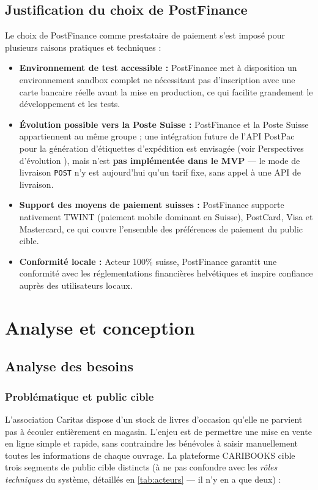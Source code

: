 \documentclass[12pt, a4paper]{report}
\renewcommand{\_}{\origunderscore\allowbreak}
\begin{document}
\section{Justification du choix de PostFinance}

Le choix de PostFinance comme prestataire de paiement s'est imposé pour plusieurs raisons pratiques et techniques :

\begin{itemize}
    \item \textbf{Environnement de test accessible :} PostFinance met à disposition un environnement sandbox complet ne nécessitant pas d'inscription avec une carte bancaire réelle avant la mise en production, ce qui facilite grandement le développement et les tests.
    \item \textbf{Évolution possible vers la Poste Suisse :} PostFinance et la Poste Suisse appartiennent au même groupe ; une intégration future de l'API PostPac pour la génération d'étiquettes d'expédition est envisagée (voir \og Perspectives d'évolution \fg{}), mais n'est \textbf{pas implémentée dans le MVP} — le mode de livraison \texttt{POST} n'y est aujourd'hui qu'un tarif fixe, sans appel à une API de livraison.
    \item \textbf{Support des moyens de paiement suisses :} PostFinance supporte nativement TWINT (paiement mobile dominant en Suisse), PostCard, Visa et Mastercard, ce qui couvre l'ensemble des préférences de paiement du public cible.
    \item \textbf{Conformité locale :} Acteur 100\% suisse, PostFinance garantit une conformité avec les réglementations financières helvétiques et inspire confiance auprès des utilisateurs locaux.
\end{itemize}

\chapter{Analyse et conception}

\section{Analyse des besoins}

\subsection{Problématique et public cible}

L'association Caritas dispose d'un stock de livres d'occasion qu'elle ne parvient pas à écouler entièrement en magasin. L'enjeu est de permettre une mise en vente en ligne simple et rapide, sans contraindre les bénévoles à saisir manuellement toutes les informations de chaque ouvrage. La plateforme CARIBOOKS cible trois segments de public cible distincts (à ne pas confondre avec les \textit{rôles techniques} du système, détaillés en \ref{tab:acteurs} — il n'y en a que deux) :
\end{document}
